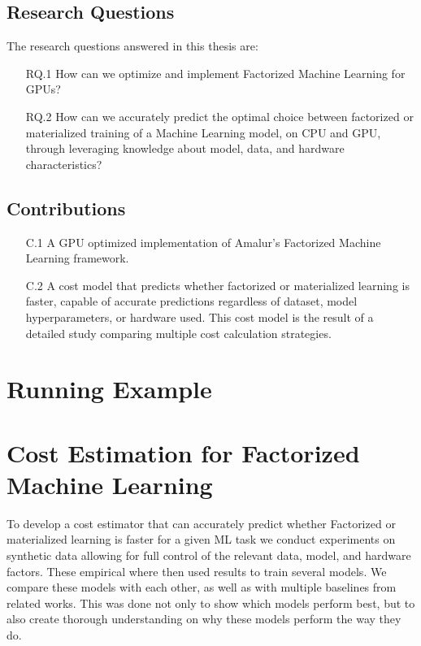 \subsection{Research Questions}
The research questions answered in this thesis are:
\begin{itemize}
    \item[RQ.1] How can we optimize and implement Factorized Machine Learning for GPUs?
    \item[RQ.2] How can we accurately predict the optimal choice between factorized or materialized training of a Machine Learning model, on CPU and GPU, through leveraging knowledge about model, data, and hardware characteristics?
\end{itemize}

\subsection{Contributions}
\begin{enumerate}
    \item[C.1] A GPU optimized implementation of Amalur's Factorized Machine Learning framework.
    \item[C.2] A cost model that predicts whether factorized or materialized learning is faster, capable of accurate predictions regardless of dataset, model hyperparameters, or hardware used. This cost model is the result of a detailed study comparing multiple cost calculation strategies.
\end{enumerate}

\section{Running Example}

\section{Cost Estimation for Factorized Machine Learning}
To develop a cost estimator that can accurately predict whether Factorized or materialized learning is faster for a given ML task we conduct experiments on synthetic data allowing for full control of the relevant data, model, and hardware factors. These empirical where then used results to train several models. We compare these models with each other, as well as with multiple baselines from related works. This was done not only to show which models perform best, but to also create thorough understanding on why these models perform the way they do.

